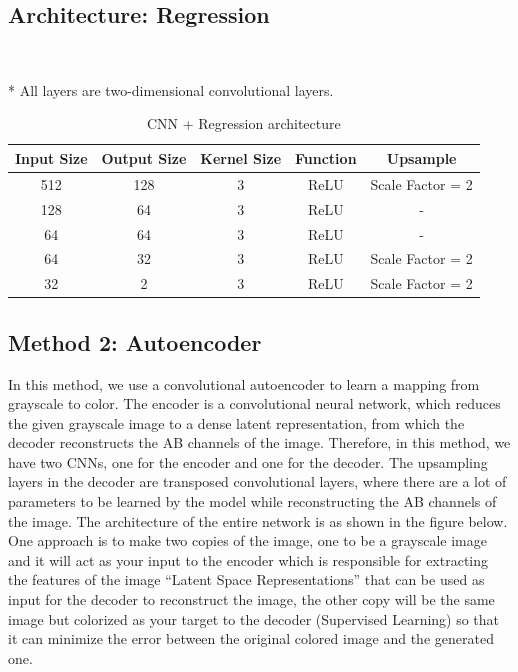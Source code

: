 \documentclass{article}
\begin{document}

\subsection{Architecture: Regression}

\

* All layers are two-dimensional convolutional layers.
\begin{table}
\begin{center}
\begin{tabular}{ |c|c|c|c|c| } 
\hline
Input Size & Output Size & Kernel Size & Function & Upsample \\
\hline
512 & 128 & 3 & ReLU & Scale Factor = 2 \\ 
128 & 64 & 3 & ReLU & - \\ 
64 & 64 & 3 & ReLU &  - \\ 
64 & 32 & 3 & ReLU & Scale Factor = 2 \\ 
32 & 2 & 3 & ReLU & Scale Factor = 2 \\ 

\hline

\end{tabular}

\end{center}
\caption{CNN + Regression architecture}
\end{table}

\pagebreak

\subsection{Method 2: Autoencoder}
In this method, we use a convolutional autoencoder to learn a mapping from grayscale to color.
The encoder is a convolutional neural network, which reduces the given grayscale image to a dense latent representation, from which the decoder reconstructs the AB channels of the image.
Therefore, in this method, we have two CNNs, one for the encoder and one for the decoder.
The upsampling layers in the decoder are transposed convolutional layers, where there are a lot of parameters to be learned by the model while reconstructing the AB channels of the image.
The architecture of the entire network is as shown in the figure below. 
One approach is to make two copies of the image, one to be a grayscale image and it will act as your input to the encoder which is responsible for extracting the features of the image 
“Latent Space Representations” that can be used as input for the decoder to reconstruct the image, the other copy will be the same image but colorized as your target to the decoder (Supervised Learning) so that it can minimize the error between the original colored image and the generated one.
\\
\end{document}
